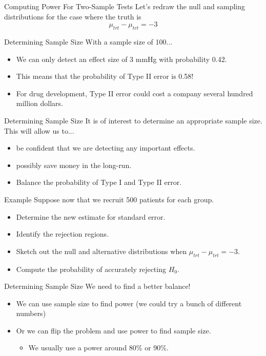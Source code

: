 \begin{frame}{Computing Power For Two-Sample Tests}
    Let's redraw the null and sampling distributions for the case where the truth is
    \[
        \mu_{trt} - \mu_{trt} = -3
    \]
\end{frame}

\begin{frame}{Determining Sample Size}
    With a sample size of 100...
    \begin{itemize}
        \item We can only detect an effect size of 3 mmHg with probability 0.42.
        \item This means that the probability of Type II error is 0.58!
        \item For drug development, Type II error could cost a company several hundred million dollars.
    \end{itemize}
\end{frame}

\begin{frame}{Determining Sample Size}
    It is of interest to determine an appropriate sample size. This will allow us to...
    \begin{itemize}
        \item be confident that we are detecting any important effects.
        \item possibly save money in the long-run.
        \item Balance the probability of Type I and Type II error.
    \end{itemize}
\end{frame}

\begin{frame}{Example}
    Suppose now that we recruit 500 patients for each group.
    \begin{itemize}
        \item <1-> Determine the new estimate for standard error.
        \item <2-> Identify the rejection regions.
        \item <3-> Sketch out the null and alternative distributions when $\mu_{trt} - \mu_{trt} = -3$.
        \item <4-> Compute the probability of accurately rejecting $H_0$.
    \end{itemize}
\end{frame}

\begin{frame}{Determining Sample Size}
    We need to find a better balance!
    \begin{itemize}
        \item We can use sample size to find power (we could try a bunch of different numbers)
        \item Or we can flip the problem and use power to find sample size.
        \begin{itemize}
            \item We usually use a power around 80\% or 90\%.
        \end{itemize}
    \end{itemize}
\end{frame}

